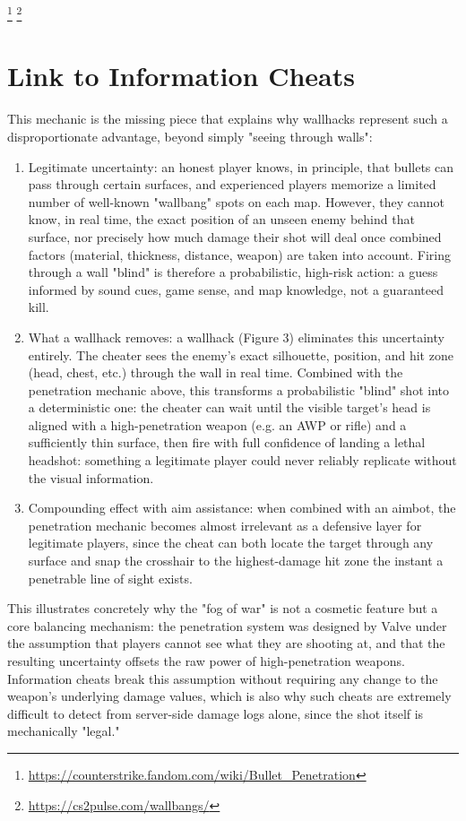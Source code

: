 \footnote{\url{https://counterstrike.fandom.com/wiki/Bullet_Penetration}}
\footnote{\url{https://cs2pulse.com/wallbangs/}}

\section{Link to Information Cheats}

This mechanic is the missing piece that explains why wallhacks represent such a disproportionate advantage, beyond simply "seeing through walls":

\begin{enumerate}
    \item Legitimate uncertainty: an honest player knows, in principle, that bullets can pass through certain surfaces, and experienced players memorize a limited number of well-known "wallbang" spots on each map. However, they cannot know, in real time, the exact position of an unseen enemy behind that surface, nor precisely how much damage their shot will deal once combined factors (material, thickness, distance, weapon) are taken into account. Firing through a wall "blind" is therefore a probabilistic, high-risk action: a guess informed by sound cues, game sense, and map knowledge, not a guaranteed kill.
\item What a wallhack removes: a wallhack (Figure 3) eliminates this uncertainty entirely. The cheater sees the enemy's exact silhouette, position, and hit zone (head, chest, etc.) through the wall in real time. Combined with the penetration mechanic above, this transforms a probabilistic "blind" shot into a deterministic one: the cheater can wait until the visible target's head is aligned with a high-penetration weapon (e.g. an AWP or rifle) and a sufficiently thin surface, then fire with full confidence of landing a lethal headshot: something a legitimate player could never reliably replicate without the visual information.
\item Compounding effect with aim assistance: when combined with an aimbot, the penetration mechanic becomes almost irrelevant as a defensive layer for legitimate players, since the cheat can both locate the target through any surface and snap the crosshair to the highest-damage hit zone the instant a penetrable line of sight exists.
\end{enumerate}

This illustrates concretely why the "fog of war" is not a cosmetic feature but a core balancing mechanism: the penetration system was designed by Valve under the assumption that players cannot see what they are shooting at, and that the resulting uncertainty offsets the raw power of high-penetration weapons. Information cheats break this assumption without requiring any change to the weapon's underlying damage values, which is also why such cheats are extremely difficult to detect from server-side damage logs alone, since the shot itself is mechanically "legal."
